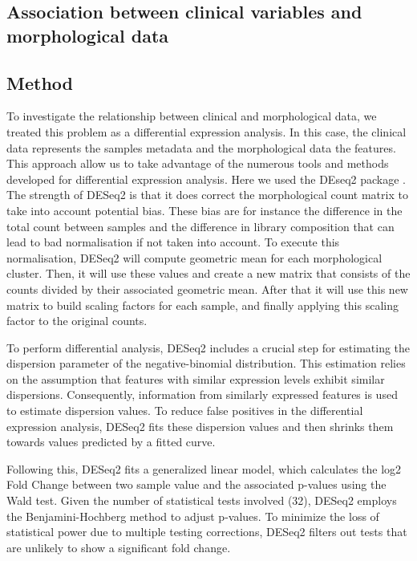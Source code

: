 \documentclass[a4paper, 11pt]{article}
\begin{document}
\begin{multicols}{2}
\section{Association between clinical variables and morphological data}

\subsection*{Method}

To investigate the relationship between clinical and morphological data, we treated this problem as a differential expression analysis. 
In this case, the clinical data represents the samples metadata and the morphological data the features. 
This approach allow us to take advantage of the numerous tools and methods developed for differential expression analysis.
Here we used the DEseq2 package \citep{DESeq2:2014}. The strength of DESeq2 is that it does correct the morphological count matrix to take into account potential bias. 
These bias are for instance the difference in the total count between samples and the difference in library composition that can lead to bad normalisation if not taken into account. 
To execute this normalisation, DESeq2 will compute geometric mean for each morphological cluster. 
Then, it will use these values and create a new matrix that consists of the counts divided by their associated geometric mean. 
After that it will use this new matrix to build scaling factors for each sample, and finally applying this scaling factor to the original counts.

To perform differential analysis, DESeq2 includes a crucial step for estimating the dispersion parameter of the negative-binomial distribution. 
This estimation relies on the assumption that features with similar expression levels exhibit similar dispersions. 
Consequently, information from similarly expressed features is used to estimate dispersion values. 
To reduce false positives in the differential expression analysis, DESeq2 fits these dispersion values and then shrinks them towards values predicted by a fitted curve. 

Following this, DESeq2 fits a generalized linear model, which calculates the log2 Fold Change between two sample value and the associated p-values using the Wald test. 
Given the number of statistical tests involved (32), DESeq2 employs the Benjamini-Hochberg method to adjust p-values. 
To minimize the loss of statistical power due to multiple testing corrections, DESeq2 filters out tests that are unlikely to show a significant fold change.


\end{multicols}
\end{document}
